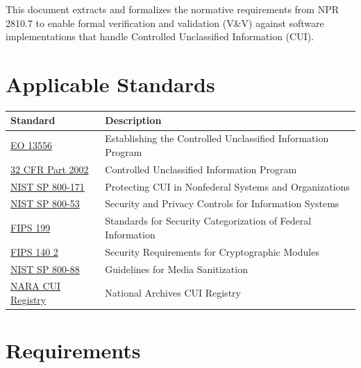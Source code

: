 \documentclass[11pt,letterpaper]{article}
\begin{document}
This document extracts and formalizes the normative requirements from NPR 2810.7 to enable formal verification and validation (V\&V) against software implementations that handle Controlled Unclassified Information (CUI).

\section{Applicable Standards}

\begin{tabularx}{\textwidth}{lX}
\toprule
\textbf{Standard} & \textbf{Description} \\
\midrule
\href{https://www.archives.gov/cui/registry/policy-guidance}{EO 13556} & Establishing the Controlled Unclassified Information Program \\
\href{https://www.ecfr.gov/current/title-32/subtitle-B/chapter-XX/part-2002}{32 CFR Part 2002} & Controlled Unclassified Information Program \\
\href{https://csrc.nist.gov/pubs/sp/800/171/r3/final}{NIST SP 800-171} & Protecting CUI in Nonfederal Systems and Organizations \\
\href{https://csrc.nist.gov/pubs/sp/800/53/r5/upd1/final}{NIST SP 800-53} & Security and Privacy Controls for Information Systems \\
\href{https://csrc.nist.gov/pubs/fips/199/final}{FIPS 199} & Standards for Security Categorization of Federal Information \\
\href{https://csrc.nist.gov/pubs/fips/140-2/final}{FIPS 140 2} & Security Requirements for Cryptographic Modules \\
\href{https://csrc.nist.gov/pubs/sp/800/88/r1/final}{NIST SP 800-88} & Guidelines for Media Sanitization \\
\href{https://www.archives.gov/cui}{NARA CUI Registry} & National Archives CUI Registry \\
\bottomrule
\end{tabularx}

\section{Requirements}
\end{document}
